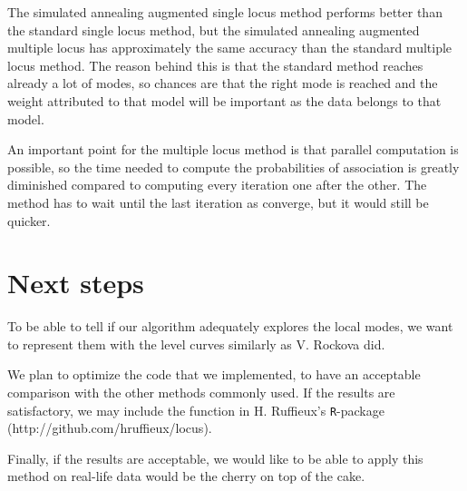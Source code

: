 \documentclass[a4paper, 11pt]{report}
\numberwithin{equation}{chapter}
\begin{document}
The simulated annealing augmented single locus method performs better than the standard single locus method, but the simulated annealing augmented multiple locus has approximately the same accuracy than the standard multiple locus method. The reason behind this is that the standard method reaches already a lot of modes, so chances are that the right mode is reached and the weight attributed to that model will be important as the data belongs to that model.

An important point for the multiple locus method is that parallel computation is possible, so the time needed to compute the probabilities of association is greatly diminished compared to computing every iteration one after the other. The method has to wait until the last iteration as converge, but it would still be quicker.

\section{Next steps}
To be able to tell if our algorithm adequately explores the local modes, we want to represent them with the level curves similarly as V. Rockova \cite{rockova} did.

We plan to optimize the code that we implemented, to have an acceptable comparison with the other methods commonly used. If the results are satisfactory, we may include the function in H. Ruffieux's \texttt{R}-package (http://github.com/hruffieux/locus).

Finally, if the results are acceptable, we would like to be able to apply this method on real-life data would be the cherry on top of the cake.
\newpage


\end{document}
